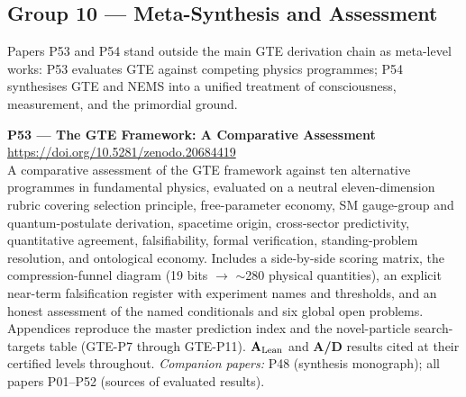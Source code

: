 \documentclass[11pt]{article}
\newcommand{\CatAL}{\ensuremath{\textbf{A}_{\rm Lean}}}
\newcommand{\CatAD}{\textbf{A/D}}
\begin{document}
\subsection{Group 10 — Meta-Synthesis and Assessment}

Papers P53 and P54 stand outside the main GTE derivation chain as meta-level
works: P53 evaluates GTE against competing physics programmes; P54 synthesises
GTE and NEMS into a unified treatment of consciousness, measurement, and the
primordial ground.

\medskip
\noindent\textbf{P53 --- The GTE Framework: A Comparative Assessment}~\cite{SpivackGTEFrameworkAssessment}\\
\url{https://doi.org/10.5281/zenodo.20684419}\\
A comparative assessment of the GTE framework against ten alternative programmes
in fundamental physics, evaluated on a neutral eleven-dimension rubric covering
selection principle, free-parameter economy, SM gauge-group and quantum-postulate
derivation, spacetime origin, cross-sector predictivity, quantitative agreement,
falsifiability, formal verification, standing-problem resolution, and ontological
economy. Includes a side-by-side scoring matrix, the compression-funnel diagram
(19 bits $\to$ $\sim$280 physical quantities), an explicit near-term falsification
register with experiment names and thresholds, and an honest assessment of the
named conditionals and six global open problems. Appendices reproduce the master
prediction index and the novel-particle search-targets table (GTE-P7 through
GTE-P11). \CatAL{} and \CatAD{} results cited at their certified levels throughout.
\emph{Companion papers:} P48 (synthesis monograph); all papers P01--P52 (sources of evaluated results).
\end{document}
